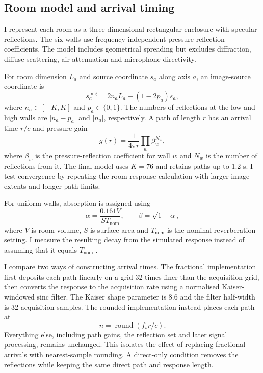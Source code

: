 \documentclass{edpsci}
\begin{document}
\subsection{Room model and arrival timing}

I represent each room as a three-dimensional rectangular enclosure with specular reflections. The six walls use frequency-independent pressure-reflection coefficients. The model includes geometrical spreading but excludes diffraction, diffuse scattering, air attenuation and microphone directivity.

For room dimension $L_a$ and source coordinate $s_a$ along axis $a$, an image-source coordinate is
\begin{equation}
	s_a^{\mathrm{img}}
	=
	2n_aL_a+(1-2p_a)s_a,
\end{equation}
where $n_a\in[-K,K]$ and $p_a\in\{0,1\}$. The numbers of reflections at the low and high walls are $\lvert n_a-p_a\rvert$ and $\lvert n_a\rvert$, respectively. A path of length $r$ has an arrival time $r/c$ and pressure gain
\begin{equation}
	g(r)
	=
	\frac{1}{4\pi r}
	\prod_w\beta_w^{N_w},
\end{equation}
where $\beta_w$ is the pressure-reflection coefficient for wall $w$ and $N_w$ is the number of reflections from it. The final model uses $K=76$ and retains paths up to 1.2 s. I test convergence by repeating the room-response calculation with larger image extents and longer path limits.

For uniform walls, absorption is assigned using
\begin{equation}
	\alpha=\frac{0.161V}{S T_{\mathrm{nom}}},
	\qquad
	\beta=\sqrt{1-\alpha},
\end{equation}
where $V$ is room volume, $S$ is surface area and $T_{\mathrm{nom}}$ is the nominal reverberation setting. I measure the resulting decay from the simulated response instead of assuming that it equals $T_{\mathrm{nom}}$ \citep{bellows}.

I compare two ways of constructing arrival times. The fractional implementation first deposits each path linearly on a grid 32 times finer than the acquisition grid, then converts the response to the acquisition rate using a normalised Kaiser-windowed sinc filter. The Kaiser shape parameter is 8.6 and the filter half-width is 32 acquisition samples. The rounded implementation instead places each path at
\begin{equation}
	n=\operatorname{round}(f_s r/c).
\end{equation}
Everything else, including path gains, the reflection set and later signal processing, remains unchanged. This isolates the effect of replacing fractional arrivals with nearest-sample rounding. A direct-only condition removes the reflections while keeping the same direct path and response length.
\end{document}
